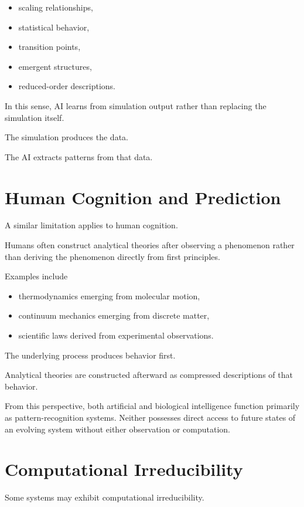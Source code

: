 \begin{itemize}
\item scaling relationships,
\item statistical behavior,
\item transition points,
\item emergent structures,
\item reduced-order descriptions.
\end{itemize}

In this sense, AI learns from simulation output rather than replacing the simulation itself.

The simulation produces the data.

The AI extracts patterns from that data.

\section{Human Cognition and Prediction}

A similar limitation applies to human cognition.

Humans often construct analytical theories after observing a phenomenon rather than deriving the phenomenon directly from first principles.

Examples include

\begin{itemize}
\item thermodynamics emerging from molecular motion,
\item continuum mechanics emerging from discrete matter,
\item scientific laws derived from experimental observations.
\end{itemize}

The underlying process produces behavior first.

Analytical theories are constructed afterward as compressed descriptions of that behavior.

From this perspective, both artificial and biological intelligence function primarily as pattern-recognition systems. Neither possesses direct access to future states of an evolving system without either observation or computation.

\section{Computational Irreducibility}

Some systems may exhibit computational irreducibility.

